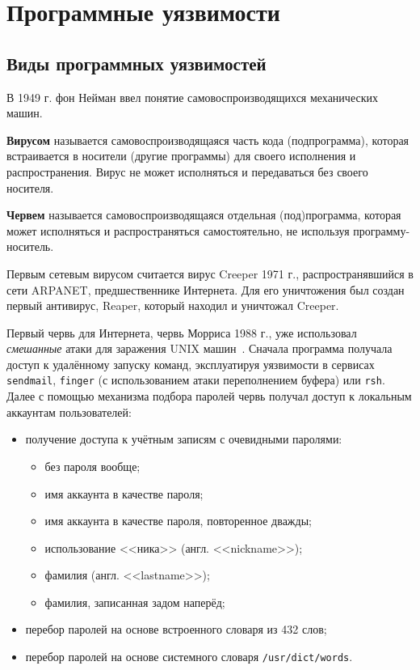 \documentclass[10pt,a4paper]{book}
\begin{document}




\chapter{Программные уязвимости}





\section{Виды программных уязвимостей}

В 1949 г. фон Нейман ввел понятие самовоспроизводящихся механических машин.

\textbf{Вирусом} называется самовоспроизводящаяся часть кода (подпрограмма), которая встраивается в носители (другие программы) для своего исполнения и распространения. Вирус не может исполняться и передаваться без своего носителя.

\textbf{Червем} называется самовоспроизводящаяся отдельная (под)программа, которая может исполняться и распространяться самостоятельно, не используя программу-носитель.

Первым сетевым вирусом считается вирус Creeper 1971 г., распространявшийся в сети ARPANET, предшественнике Интернета. Для его уничтожения был создан первый антивирус, Reaper, который находил и уничтожал Creeper.

Первый червь для Интернета, червь Морриса 1988 г., уже использовал \emph{смешанные} атаки для заражения UNIX машин~\cite{EichinRochlis:1988}\cite{Spafford:1989}. Сначала программа получала доступ к удалённому запуску команд, эксплуатируя уязвимости в сервисах \texttt{sendmail}, \texttt{finger} (с использованием атаки переполнением буфера) или \texttt{rsh}. Далее с помощью механизма подбора паролей червь получал доступ к локальным аккаунтам пользователей:
\begin{itemize}
    \item получение доступа к учётным записям с очевидными паролями:
		\begin{itemize}
			\item без пароля вообще;
			\item имя аккаунта в качестве пароля;
			\item имя аккаунта в качестве пароля, повторенное дважды;
			\item использование <<ника>> (англ. <<nickname>>);
			\item фамилия (англ. <<lastname>>);
			\item фамилия, записанная задом наперёд;
		\end{itemize}
		\item перебор паролей на основе встроенного словаря из 432 слов;
		\item перебор паролей на основе системного словаря \texttt{/usr/dict/words}.
\end{itemize}
\end{document}
